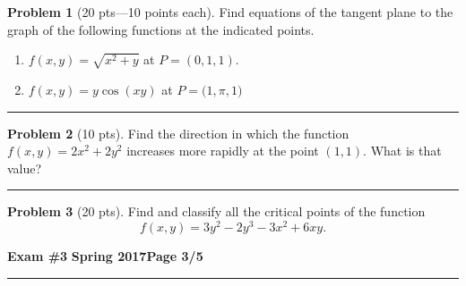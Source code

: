 \documentclass[12pt]{article}
\theoremstyle{definition}
\newtheorem{problem}{Problem}
\begin{document}
\bigskip
\begin{problem}[20 pts---10 points each] Find equations of the tangent plane to the graph of the following functions at the indicated points.
\begin{enumerate}
  \item $f(x,y) = \sqrt{x^2+y}$ at $P=(0,1,1)$.
  \vspace{1cm}
  \begin{flushright}
  \end{flushright}
  \item $f(x,y) = y\cos(xy)$ at $P=\big(1,\pi,1 \big)$
  \vspace{1cm}
  \begin{flushright}
  \end{flushright}
\end{enumerate}
\end{problem}
\hrule

\begin{problem}[10 pts]
Find the direction in which the function $f(x,y)= 2x^2 + 2y^2$ increases more rapidly at the point $(1,1)$.  What is that value?

\vspace{2cm}
\begin{flushright}
  \end{flushright}
\end{problem}
\hrule

\begin{problem}[20 pts]
Find and classify all the critical points of the function 
\begin{equation*}
f(x,y) = 3y^2 - 2y^3-3x^2+6xy.
\end{equation*}
\end{problem}

\newpage

\hfill{\large\bf Exam \#3}\hfill{\large\bf
  Spring 2017}\hfill{\large\bf Page 3/5}\hrule
\end{document}
